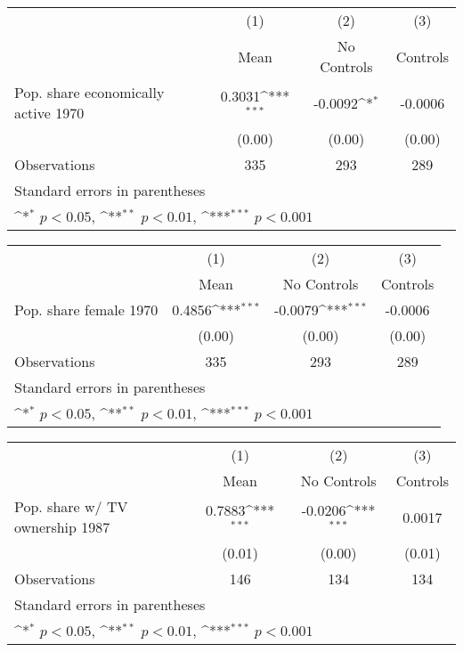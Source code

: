{
\def\sym#1{\ifmmode^{#1}\else\(^{#1}\)\fi}
\begin{tabular}{l*{3}{c}}
\hline\hline
                    &\multicolumn{1}{c}{(1)}&\multicolumn{1}{c}{(2)}&\multicolumn{1}{c}{(3)}\\
                    &\multicolumn{1}{c}{Mean}&\multicolumn{1}{c}{No Controls}&\multicolumn{1}{c}{Controls}\\
\hline
Pop. share economically active 1970&      0.3031\sym{***}&     -0.0092\sym{*}  &     -0.0006         \\
                    &      (0.00)         &      (0.00)         &      (0.00)         \\
\hline
Observations        &         335         &         293         &         289         \\
\hline\hline
\multicolumn{4}{l}{\footnotesize Standard errors in parentheses}\\
\multicolumn{4}{l}{\footnotesize \sym{*} \(p<0.05\), \sym{**} \(p<0.01\), \sym{***} \(p<0.001\)}\\
\end{tabular}
}
{
\def\sym#1{\ifmmode^{#1}\else\(^{#1}\)\fi}
\begin{tabular}{l*{3}{c}}
\hline\hline
                    &\multicolumn{1}{c}{(1)}&\multicolumn{1}{c}{(2)}&\multicolumn{1}{c}{(3)}\\
                    &\multicolumn{1}{c}{Mean}&\multicolumn{1}{c}{No Controls}&\multicolumn{1}{c}{Controls}\\
\hline
Pop. share female 1970&      0.4856\sym{***}&     -0.0079\sym{***}&     -0.0006         \\
                    &      (0.00)         &      (0.00)         &      (0.00)         \\
\hline
Observations        &         335         &         293         &         289         \\
\hline\hline
\multicolumn{4}{l}{\footnotesize Standard errors in parentheses}\\
\multicolumn{4}{l}{\footnotesize \sym{*} \(p<0.05\), \sym{**} \(p<0.01\), \sym{***} \(p<0.001\)}\\
\end{tabular}
}
{
\def\sym#1{\ifmmode^{#1}\else\(^{#1}\)\fi}
\begin{tabular}{l*{3}{c}}
\hline\hline
                    &\multicolumn{1}{c}{(1)}&\multicolumn{1}{c}{(2)}&\multicolumn{1}{c}{(3)}\\
                    &\multicolumn{1}{c}{Mean}&\multicolumn{1}{c}{No Controls}&\multicolumn{1}{c}{Controls}\\
\hline
Pop. share w/ TV ownership 1987&      0.7883\sym{***}&     -0.0206\sym{***}&      0.0017         \\
                    &      (0.01)         &      (0.00)         &      (0.01)         \\
\hline
Observations        &         146         &         134         &         134         \\
\hline\hline
\multicolumn{4}{l}{\footnotesize Standard errors in parentheses}\\
\multicolumn{4}{l}{\footnotesize \sym{*} \(p<0.05\), \sym{**} \(p<0.01\), \sym{***} \(p<0.001\)}\\
\end{tabular}
}
